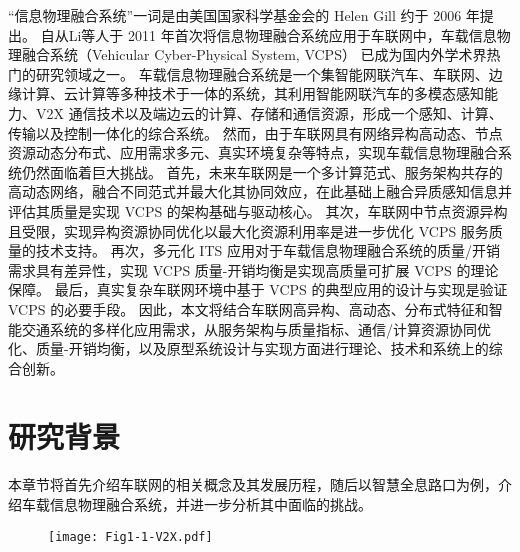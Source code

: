“信息物理融合系统”一词是由美国国家科学基金会的 Helen Gill 约于 2006 年提出\cite{lee2016introduction}。
自从Li等人\cite{li2011human}于 2011 年首次将信息物理融合系统应用于车联网中，车载信息物理融合系统（Vehicular Cyber-Physical System, VCPS）\cite{xia2019zi} 已成为国内外学术界热门的研究领域之一。
车载信息物理融合系统是一个集智能网联汽车、车联网、边缘计算、云计算等多种技术于一体的系统，其利用智能网联汽车的多模态感知能力、V2X 通信技术以及端边云的计算、存储和通信资源，形成一个感知、计算、传输以及控制一体化的综合系统。
然而，由于车联网具有网络异构高动态、节点资源动态分布式、应用需求多元、真实环境复杂等特点，实现车载信息物理融合系统仍然面临着巨大挑战。
首先，未来车联网是一个多计算范式、服务架构共存的高动态网络，融合不同范式并最大化其协同效应，在此基础上融合异质感知信息并评估其质量是实现 VCPS 的架构基础与驱动核心。
其次，车联网中节点资源异构且受限，实现异构资源协同优化以最大化资源利用率是进一步优化 VCPS 服务质量的技术支持。
再次，多元化 ITS 应用对于车载信息物理融合系统的质量/开销需求具有差异性，实现 VCPS 质量-开销均衡是实现高质量可扩展 VCPS 的理论保障。
最后，真实复杂车联网环境中基于 VCPS 的典型应用的设计与实现是验证 VCPS 的必要手段。
因此，本文将结合车联网高异构、高动态、分布式特征和智能交通系统的多样化应用需求，从服务架构与质量指标、通信/计算资源协同优化、质量-开销均衡，以及原型系统设计与实现方面进行理论、技术和系统上的综合创新。

\section{研究背景}\label{section 1-2}

本章节将首先介绍车联网的相关概念及其发展历程，随后以智慧全息路口为例，介绍车载信息物理融合系统，并进一步分析其中面临的挑战。

\begin{figure}[h]
	\centering
\texttt{[image: Fig1-1-V2X.pdf]}
	\label{fig 1-1}
\end{figure}

